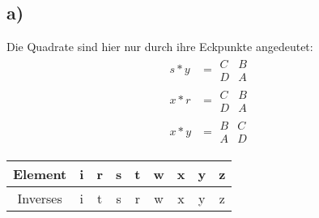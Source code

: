 \documentclass[a4paper]{scrartcl}
\begin{document}
	\subsection{a)}
		Die Quadrate sind hier nur durch ihre Eckpunkte angedeutet:
		\begin{align}
			s*y&=\begin{matrix}
				C&B \\
				D&A
			\end{matrix} \\
			x*r&=\begin{matrix}
				C&B\\
				D&A
			\end{matrix} \\
			x*y&=\begin{matrix}
				B&C \\
				A&D
			\end{matrix}
		\end{align}
		\begin{tabular}{c|c|c|c|c|c|c|c|c}
				Element&i&r&s&t&w&x&y&z \\ \hline
				Inverses&i&t&s&r&w&x&y&z
		\end{tabular}
		\newpage
\end{document}
